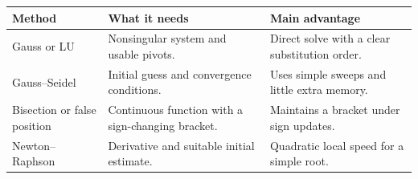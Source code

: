 \documentclass[12pt,a4paper]{article}
\begin{document}
\begin{tcolorbox}[tikzbox, title={Summary Comparison}]
\par\vspace{5pt}
\begingroup
\setlength{\extrarowheight}{1pt}
\noindent\begin{tabularx}{\linewidth}{|B{3.45cm}|Y|Y|}
\hline
\textbf{Method} & \textbf{What it needs} & \textbf{Main advantage} \\ \hline
Gauss or LU & Nonsingular system and usable pivots. & Direct solve with a clear substitution order. \\ \hline
Gauss--Seidel & Initial guess and convergence conditions. & Uses simple sweeps and little extra memory. \\ \hline
Bisection or false position & Continuous function with a sign-changing bracket. & Maintains a bracket under sign updates. \\ \hline
Newton--Raphson & Derivative and suitable initial estimate. & Quadratic local speed for a simple root. \\ \hline
\end{tabularx}\par
\endgroup
\end{tcolorbox}
\end{document}
